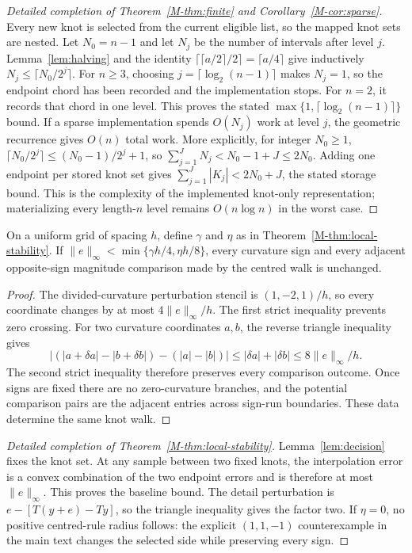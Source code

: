 \begin{proof}[Detailed completion of Theorem~\ref{M-thm:finite} and Corollary~\ref{M-cor:sparse}]
Every new knot is selected from the current eligible list, so the mapped knot
sets are nested.  Let $N_0=n-1$ and let $N_j$ be the number of intervals after
level $j$.  Lemma~\ref{lem:halving} and the identity
$\lceil\lceil a/2\rceil/2\rceil=\lceil a/4\rceil$ give inductively
$N_j\le\lceil N_0/2^j\rceil$.  For $n\ge3$, choosing
$j=\lceil\log_2(n-1)\rceil$ makes $N_j=1$, so the endpoint chord has been
recorded and the implementation stops.  For $n=2$, it records that chord in
one level.  This proves the stated
$\max\{1,\lceil\log_2(n-1)\rceil\}$ bound.  If a sparse implementation spends
$O(N_j)$ work at level $j$, the geometric recurrence gives $O(n)$ total work.
More explicitly, for integer $N_0\ge1$,
$\lceil N_0/2^j\rceil\le(N_0-1)/2^j+1$, so
$\sum_{j=1}^J N_j<N_0-1+J\le2N_0$.  Adding one endpoint per stored knot set
gives $\sum_{j=1}^J|K_j|<2N_0+J$, the stated storage bound.  This is the
complexity of the implemented knot-only representation; materializing every
length-$n$ level remains $O(n\log n)$ in the worst case.
\end{proof}

\begin{lemma}
\label{lem:decision}
On a uniform grid of spacing $h$, define $\gamma$ and $\eta$ as in
Theorem~\ref{M-thm:local-stability}.
If
$\|e\|_\infty<\min\{\gamma h/4,\eta h/8\}$, every curvature sign and every
adjacent opposite-sign magnitude comparison made by the centred walk is
unchanged.
\end{lemma}
\begin{proof}
The divided-curvature perturbation stencil is
$(1,-2,1)/h$, so every coordinate changes by at most
$4\|e\|_\infty/h$.  The first strict inequality prevents zero crossing.  For
two curvature coordinates $a,b$, the reverse triangle inequality gives
\[
\left|(|a+\delta a|-|b+\delta b|)-(|a|-|b|)\right|
\le |\delta a|+|\delta b|
\le8\|e\|_\infty/h.
\]
The second strict inequality therefore preserves every comparison outcome.
Once signs are fixed there are no zero-curvature branches, and the potential
comparison pairs are the adjacent entries across sign-run boundaries.  These
data determine the same knot walk.
\end{proof}

\begin{proof}[Detailed completion of Theorem~\ref{M-thm:local-stability}]
Lemma~\ref{lem:decision} fixes the knot set.  At any sample between two fixed
knots, the interpolation error is a convex combination of the two endpoint
errors and is therefore at most $\|e\|_\infty$.  This proves the baseline
bound.  The detail perturbation is $e-[T(y+e)-Ty]$, so the triangle inequality
gives the factor two.  If $\eta=0$, no positive centred-rule radius follows:
the explicit $(1,1,-1)$ counterexample in the main text changes the selected
side while preserving every sign.
\end{proof}

